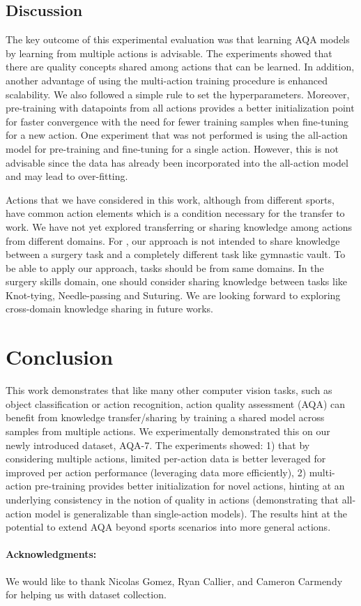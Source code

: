 \documentclass[10pt,twocolumn,letterpaper]{article}
\begin{document}
\subsection{Discussion}
The key outcome of this experimental evaluation was that learning AQA models by learning from multiple actions is advisable.  The experiments showed that there are quality concepts shared among actions that can be learned.  In addition, another advantage of using the multi-action training procedure is enhanced scalability.  We also followed a simple rule to set the hyperparameters. Moreover, pre-training with datapoints from all actions provides a better initialization point for faster convergence with the need for fewer training samples when fine-tuning for a new action.  One experiment that was not performed is using the all-action model for pre-training and fine-tuning for a single action.  However, this is not advisable since the data has already been incorporated into the all-action model and may lead to over-fitting.  

Actions that we have considered in this work, although from different sports, have common action elements which is a condition necessary for the transfer to work. We have not yet explored transferring or sharing knowledge among actions from different domains. For \eg, our approach is not intended to share knowledge between a surgery task and a completely different task like gymnastic vault. To be able to apply our approach, tasks should be from same domains. In the surgery skills domain, one should consider sharing knowledge between tasks like Knot-tying, Needle-passing and Suturing. We are looking forward to exploring cross-domain knowledge sharing in future works.
\section{Conclusion}
\label{conclusion}
This work demonstrates that like many other computer vision tasks, such as object classification or action recognition, action quality assessment (AQA) can benefit from knowledge transfer/sharing by training a shared model across samples from multiple actions. We experimentally demonstrated this on our newly introduced dataset, AQA-7.  The experiments showed: 1) that by considering multiple actions, limited per-action data is better leveraged for improved per action performance (leveraging data more efficiently), 2) multi-action pre-training provides better initialization for novel actions, hinting at an underlying consistency in the notion of quality in actions (demonstrating that all-action model is generalizable than single-action models). The results hint at the potential to extend AQA beyond sports scenarios into more general actions.  
\paragraph{Acknowledgments:} We would like to thank Nicolas Gomez, Ryan Callier, and Cameron Carmendy for helping us with dataset collection.  
{\small


}
\end{document}
